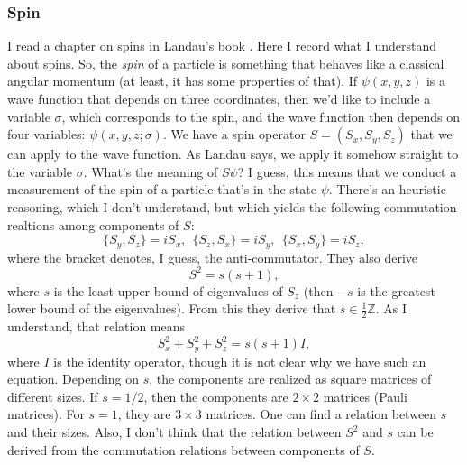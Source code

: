 \subsubsection{Spin}
I read a chapter on spins in Landau's book \cite{landau}. Here I record what I understand about spins. So, the \emph{spin} of a particle is something that behaves like a classical angular momentum (at least, it has some properties of that). If $\psi(x,y,z)$ is a wave function that depends on three coordinates, then we'd like to include a variable $\sigma$, which corresponds to the spin, and the wave function then depends on four variables: $\psi(x,y,z;\sigma)$. We have a spin operator $S = (S_x,S_y,S_z)$ that we can apply to the wave function. As Landau says, we apply it somehow straight to the variable $\sigma$. What's the meaning of $S\psi$? I guess, this means that we conduct a measurement of the spin of a particle that's in the state $\psi$. There's an heuristic reasoning, which I don't understand, but which yields the following commutation realtions among components of $S$:
\[
\{S_y,S_z\} = iS_x, \ \ \{S_z,S_x\} = iS_y, \ \ \{S_x,S_y\} = iS_z,
\]
where the bracket denotes, I guess, the anti-commutator.
They also derive
\[
S^2 = s(s+1),
\]
where $s$ is the least upper bound of eigenvalues of $S_z$ (then $-s$ is the greatest lower bound of the eigenvalues). From this they derive that $s \in \frac{1}{2}\mathbb{Z}$. As I understand, that relation means
\[
S_x^2 + S_y^2 + S_z^2 = s(s+1) I,
\]
where $I$ is the identity operator, though it is not clear why we have such an equation. Depending on $s$, the components are realized as square matrices of different sizes. If $s = 1/2$, then the components are $2 \times 2$ matrices (Pauli matrices). For $s = 1$, they are $3 \times 3$ matrices. One can find a relation between $s$ and their sizes. Also, I don't think that the relation between $S^2$ and $s$ can be derived from the commutation relations between components of $S$.